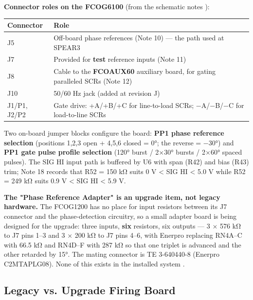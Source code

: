 \textbf{Connector roles on the FCOG6100} (from the schematic notes ):

\begin{longtable}[]{@{}ll@{}}
\toprule\noalign{}
Connector & Role \\
\midrule\noalign{}
\endhead
\bottomrule\noalign{}
\endlastfoot
J5 & Off-board phase references (Note 10) --- the path used at SPEAR3 \\
J7 & Provided for \textbf{test} reference inputs (Note 11) \\
J8 & Cable to the \textbf{FCOAUX60} auxiliary board, for gating paralleled SCRs (Note 12) \\
J10 & 50/60 Hz jack (added at revision J) \\
J1/P1, J2/P2 & Gate drive: +A/+B/+C for line-to-load SCRs; −A/−B/−C for load-to-line SCRs \\
\end{longtable}

Two on-board jumper blocks configure the board: \textbf{PP1 phase reference selection} (positions 1,2,3 open + 4,5,6 closed = 0°; the reverse = −30°) and \textbf{PP1 gate pulse profile selection} (120° burst / 2×30° bursts / 2×60° spaced pulses). The SIG HI input path is buffered by U6 with span (R42) and bias (R43) trim; Note 18 records that R52 = 150 kΩ suits 0 V \textless{} SIG HI \textless{} 5.0 V while R52 = 249 kΩ suits 0.9 V \textless{} SIG HI \textless{} 5.9 V.

\begin{keynote}
\textbf{The "Phase Reference Adapter" is an upgrade item, not legacy hardware.} The FCOG1200 has no place for input resistors between its J7 connector and the phase-detection circuitry, so a small adapter board is being designed for the upgrade: three inputs, \textbf{six} resistors, six outputs --- 3 × 576 kΩ to J7 pins 1--3 and 3 × 200 kΩ to J7 pins 4--6, with Enerpro replacing RN4A--C with 66.5 kΩ and RN4D--F with 287 kΩ so that one triplet is advanced and the other retarded by 15°. The mating connector is TE 3-640440-8 (Enerpro C2MTAPLG08). None of this exists in the installed system .
\end{keynote}

\subsection{Legacy vs. Upgrade Firing Board}

